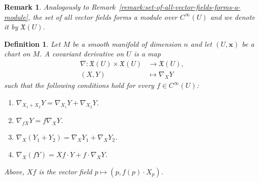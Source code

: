 \documentclass[11pt,a4paper,twoside,openany]{report}
\theoremstyle{my-theorem}
\theoremstyle{non-theorem}
\newtheorem{definition}[theorem]{Definition}
\newtheorem{remark}[theorem]{Remark}
\begin{document}
			\begin{remark}
%				
				Analogously to Remark~\ref{remark:set-of-all-vector-fields-forms-a-module}, the set of all vector fields forms a \emph{module} over $C^\infty(U)$ and we denote it by $\mathfrak X(U)$.
			\end{remark}
			
			\begin{definition}
				\label{def:abstract-covariant-derivative}
				Let $M$ be a smooth manifold of dimension $n$ and let $(U,\mathbf x)$ be a chart on $M$. A \emph{covariant derivative} on $U$ is a map
				\begin{align*}
					\nabla: \mathfrak X(U) \times \mathfrak X(U) &\to \mathfrak X(U),
				\\
					(X,Y) &\mapsto \nabla_XY
				\end{align*}
				such that the following conditions hold for every $f \in C^\infty(U)$:
				\begin{enumerate}[label=\rm(D\arabic*)]
					\item $\nabla_{X_1+X_2}Y = \nabla_{X_1}Y + \nabla_{X_2}Y$.
					\item $\nabla_{fX}Y = f\nabla_XY$.
					\item $\nabla_X(Y_1+Y_2) = \nabla_XY_1 + \nabla_XY_2$.
					\item $\nabla_X(fY) = Xf\cdot Y + f\cdot \nabla_XY$.
				\end{enumerate}
				Above, $Xf$ is the vector field $p \mapsto (p,f(p) \cdot X_p)$.
			\end{definition}
		
\end{document}
